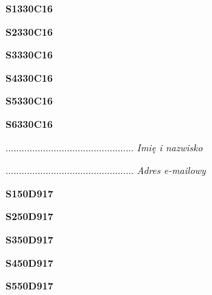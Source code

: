 \begin{turn}{90}\huge \textbf{S1330C16}\end{turn}

\begin{turn}{90}\huge \textbf{S2330C16}\end{turn}

\begin{turn}{90}\huge \textbf{S3330C16}\end{turn}

\begin{turn}{90}\huge \textbf{S4330C16}\end{turn}

\begin{turn}{90}\huge \textbf{S5330C16}\end{turn}

\begin{turn}{90}\huge \textbf{S6330C16}\end{turn}

\begin{turn}{90}\begin{minipage}{\linewidth} \vspace{20mm} ................................................  \textit{Imię i nazwisko}\end{minipage}\end{turn}

\begin{turn}{90}\begin{minipage}{\linewidth} \vspace{20mm} ................................................  \textit{Adres e-mailowy}\end{minipage}\end{turn}

\begin{turn}{90}\huge \textbf{S150D917}\end{turn}

\begin{turn}{90}\huge \textbf{S250D917}\end{turn}

\begin{turn}{90}\huge \textbf{S350D917}\end{turn}

\begin{turn}{90}\huge \textbf{S450D917}\end{turn}

\begin{turn}{90}\huge \textbf{S550D917}\end{turn}

